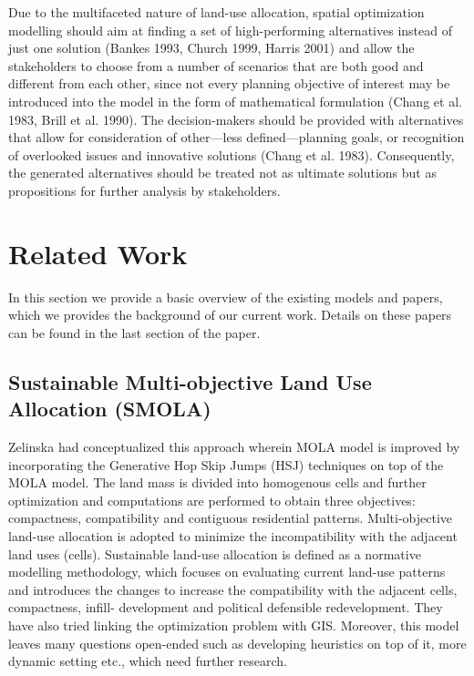 \documentclass{sig-alternate}
\begin{document}
Due to the multifaceted nature of land-use allocation, spatial optimization modelling should aim at finding a set of high-performing alternatives instead of just one solution (Bankes 1993, Church 1999, Harris 2001) and allow the stakeholders to choose from a number of scenarios that are both good and different from each other, since not every planning objective of interest may be introduced into the
model in the form of mathematical formulation (Chang et al. 1983, Brill et al. 1990). The decision-makers should be provided with alternatives that allow for consideration of other—less defined—planning goals, or recognition of overlooked issues and innovative solutions (Chang et al. 1983). Consequently, the generated alternatives should be treated not as ultimate solutions but as propositions for further analysis by stakeholders.

\section{Related Work}
In this section we provide a basic overview of the existing models and papers, which we provides the background of our current work. Details on these papers can be found in the last section of the paper. \\
\subsection{Sustainable Multi-objective Land Use Allocation (SMOLA)}  Zelinska had conceptualized this approach wherein MOLA model is improved by incorporating the Generative Hop Skip Jumps (HSJ) techniques on top of the MOLA model. The land mass is divided into homogenous cells and further optimization and computations are performed to obtain three objectives: compactness, compatibility and contiguous residential patterns. Multi-objective land-use allocation is adopted to minimize the incompatibility with the adjacent land uses (cells). Sustainable land-use allocation is defined as a normative modelling methodology, which focuses on evaluating current land-use patterns and introduces the changes to increase the compatibility with the adjacent cells, compactness, infill- development and political defensible redevelopment. They have also tried linking the optimization problem with GIS. Moreover, this model leaves many questions open-ended such as developing heuristics on top of it, more dynamic setting etc., which need further research. \\
\end{document}
